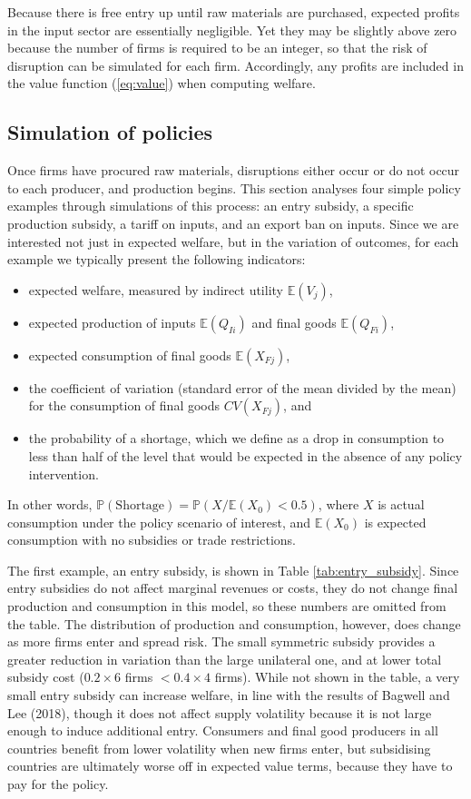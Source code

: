 \documentclass{article}
\begin{document}
Because there is free entry up until raw materials are purchased, expected profits in the input sector are essentially negligible. Yet they may be slightly above zero because the number of firms is required to be an integer, so that the risk of disruption can be simulated for each firm. Accordingly, any profits are included in the value function (\ref{eq:value}) when computing welfare.

\subsection{Simulation of policies}

Once firms have procured raw materials, disruptions either occur or do not occur to each producer, and production begins. This section analyses four simple policy examples through simulations of this process: an entry subsidy, a specific production subsidy, a tariff on inputs, and an export ban on inputs. Since we are interested not just in expected welfare, but in the variation of outcomes, for each example we typically present the following indicators:
\begin{itemize}
    \item expected welfare, measured by indirect utility $\mathbb{E} (V_j)$, 
    \item expected production of inputs $\mathbb{E} (Q_{Ii})$ and final goods $\mathbb{E} (Q_{Fi})$, 
    \item expected consumption of final goods $\mathbb{E} (X_{Fj})$, 
    \item the coefficient of variation (standard error of the mean divided by the mean) for the consumption of final goods $CV (X_{Fj})$, and
    \item the probability of a shortage, which we define as a drop in consumption to less than half of the level that would be expected in the absence of any policy intervention.
\end{itemize}
In other words, $\mathbb{P}(\text{Shortage}) = \mathbb{P} (X / \mathbb{E}(X_0) < 0.5)$, where $X$ is actual consumption under the policy scenario of interest, and $\mathbb{E} (X_0)$ is expected consumption with no subsidies or trade restrictions.

The first example, an entry subsidy, is shown in Table \ref{tab:entry_subsidy}. Since entry subsidies do not affect marginal revenues or costs, they do not change final production and consumption in this model, so these numbers are omitted from the table. The distribution of production and consumption, however, does change as more firms enter and spread risk. The small symmetric subsidy provides a greater reduction in variation than the large unilateral one, and at lower total subsidy cost ($0.2 \times 6$ firms $< 0.4 \times 4$ firms). While not shown in the table, a very small entry subsidy can increase welfare, in line with the results of Bagwell and Lee (2018), though it does not affect supply volatility because it is not large enough to induce additional entry. Consumers and final good producers in all countries benefit from lower volatility when new firms enter, but subsidising countries are ultimately worse off in expected value terms, because they have to pay for the policy.
\end{document}
